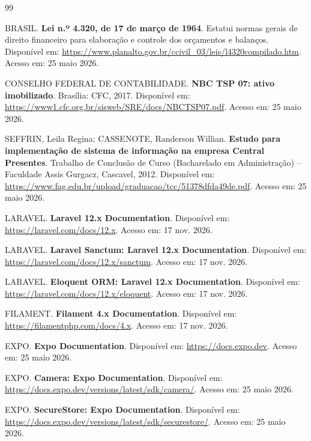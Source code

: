 \documentclass[12pt,a4paper]{article}
\begin{document}
\clearpage
{}
\begin{thebibliography}{99}

BRASIL. \textbf{Lei n.º 4.320, de 17 de março de 1964}. Estatui normas gerais de direito financeiro para elaboração e controle dos orçamentos e balanços. Disponível em: \url{https://www.planalto.gov.br/ccivil_03/leis/l4320compilado.htm}. Acesso em: 25 maio 2026.

CONSELHO FEDERAL DE CONTABILIDADE. \textbf{NBC TSP 07: ativo imobilizado}. Brasília: CFC, 2017. Disponível em: \url{https://www1.cfc.org.br/sisweb/SRE/docs/NBCTSP07.pdf}. Acesso em: 25 maio 2026.

SEFFRIN, Leila Regina; CASSENOTE, Randerson Willian. \textbf{Estudo para implementação de sistema de informação na empresa Central Presentes}. Trabalho de Conclusão de Curso (Bacharelado em Administração) -- Faculdade Assis Gurgacz, Cascavel, 2012. Disponível em: \url{https://www.fag.edu.br/upload/graduacao/tcc/51378dfda49de.pdf}. Acesso em: 25 maio 2026.

LARAVEL. \textbf{Laravel 12.x Documentation}. Disponível em: \url{https://laravel.com/docs/12.x}. Acesso em: 17 nov. 2026.

LARAVEL. \textbf{Laravel Sanctum: Laravel 12.x Documentation}. Disponível em: \url{https://laravel.com/docs/12.x/sanctum}. Acesso em: 17 nov. 2026.

LARAVEL. \textbf{Eloquent ORM: Laravel 12.x Documentation}. Disponível em: \url{https://laravel.com/docs/12.x/eloquent}. Acesso em: 17 nov. 2026.

FILAMENT. \textbf{Filament 4.x Documentation}. Disponível em: \url{https://filamentphp.com/docs/4.x}. Acesso em: 17 nov. 2026.

EXPO. \textbf{Expo Documentation}. Disponível em: \url{https://docs.expo.dev}. Acesso em: 25 maio 2026.

EXPO. \textbf{Camera: Expo Documentation}. Disponível em: \url{https://docs.expo.dev/versions/latest/sdk/camera/}. Acesso em: 25 maio 2026.

EXPO. \textbf{SecureStore: Expo Documentation}. Disponível em: \url{https://docs.expo.dev/versions/latest/sdk/securestore/}. Acesso em: 25 maio 2026.


\end{thebibliography}
\end{document}
